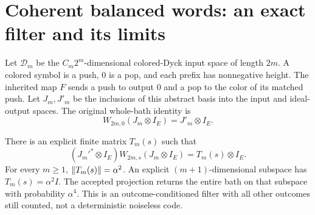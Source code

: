 \section{Coherent balanced words: an exact filter and its limits}\label{sec:filter}

Let $\mathcal D_m$ be the $C_m2^m$-dimensional colored-Dyck input space of length $2m$. A colored symbol is a push, $0$ is a pop, and each prefix has nonnegative height. The inherited map $F$ sends a push to output $0$ and a pop to the color of its matched push. Let $J_m,J'_m$ be the inclusions of this abstract basis into the input and ideal-output spaces. The original whole-bath identity is
\[
 W_{2m,0}(J_m\otimes I_E)=J'_m\otimes I_E.
\]

\begin{theorem}\label{thm:filter}
There is an explicit finite matrix $T_m(s)$ such that
\begin{equation}
 (J_m'^*\otimes I_E)W_{2m,s}(J_m\otimes I_E)=T_m(s)\otimes I_E.
 \label{eq:filter}
\end{equation}
For every $m\ge1$, $\lVert T_m(s)\rVert=\alpha^2$. An explicit $(m+1)$-dimensional subspace has $T_m(s)=\alpha^2 I$. The accepted projection returns the entire bath on that subspace with probability $\alpha^4$. This is an outcome-conditioned filter with all other outcomes still counted, not a deterministic noiseless code.
\end{theorem}
